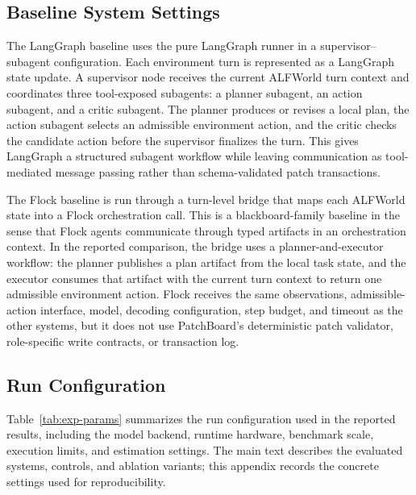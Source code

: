 \documentclass[11pt]{article}
\newcommand{\method}{PatchBoard}
\begin{document}
\subsection{Baseline System Settings}
\label{app:baseline_setting}

The LangGraph baseline uses the pure LangGraph runner in a supervisor--subagent configuration. Each environment turn is represented as a LangGraph state update. A supervisor node receives the current ALFWorld turn context and coordinates three tool-exposed subagents: a planner subagent, an action subagent, and a critic subagent. The planner produces or revises a local plan, the action subagent selects an admissible environment action, and the critic checks the candidate action before the supervisor finalizes the turn. This gives LangGraph a structured subagent workflow while leaving communication as tool-mediated message passing rather than schema-validated patch transactions.

The Flock baseline is run through a turn-level bridge that maps each ALFWorld state into a Flock orchestration call. This is a blackboard-family baseline in the sense that Flock agents communicate through typed artifacts in an orchestration context. In the reported comparison, the bridge uses a planner-and-executor workflow: the planner publishes a plan artifact from the local task state, and the executor consumes that artifact with the current turn context to return one admissible environment action. Flock receives the same observations, admissible-action interface, model, decoding configuration, step budget, and timeout as the other systems, but it does not use \method{}'s deterministic patch validator, role-specific write contracts, or transaction log.

\subsection{Run Configuration}
\label{app:exp-params}

Table~\ref{tab:exp-params} summarizes the run configuration used in the reported results, including the model backend, runtime hardware, benchmark scale, execution limits, and estimation settings. The main text describes the evaluated systems, controls, and ablation variants; this appendix records the concrete settings used for reproducibility.
\end{document}

